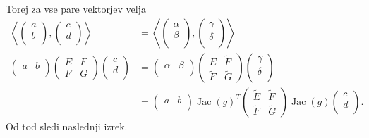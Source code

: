 Torej za vse pare vektorjev velja 
\begin{align*} 
    \left\langle \begin{pmatrix}
      a\\
      b\\
    \end{pmatrix}, \begin{pmatrix}
      c\\
      d\\
    \end{pmatrix} \right\rangle  &= \left\langle \begin{pmatrix}
      \alpha\\
      \beta  \\
    \end{pmatrix}, \begin{pmatrix}
      \gamma\\
      \delta  \\
    \end{pmatrix} \right\rangle  \\
    \begin{pmatrix}
      a & b\\
    \end{pmatrix} \begin{pmatrix}
    E & F \\
    F & G
    \end{pmatrix} \begin{pmatrix}
      c\\
      d  \\
    \end{pmatrix}  &= \begin{pmatrix}
      \alpha & \beta\\
    \end{pmatrix} \begin{pmatrix}
    \tilde{E} & \tilde{F} \\
    \tilde{F} & \tilde{G}
    \end{pmatrix} \begin{pmatrix}
      \gamma \\
      \delta  \\
    \end{pmatrix} \\ 
    &= \begin{pmatrix}
      a & b\\
    \end{pmatrix} 
    \operatorname{Jac}(g)^{T}
    \begin{pmatrix}
      \tilde{E} & \tilde{F} \\
      \tilde{F} & \tilde{G}
      \end{pmatrix}
    \operatorname{Jac}(g)
    \begin{pmatrix}
      c\\
      d  \\
    \end{pmatrix}.
\end{align*} 
Od tod sledi naslednji izrek.


